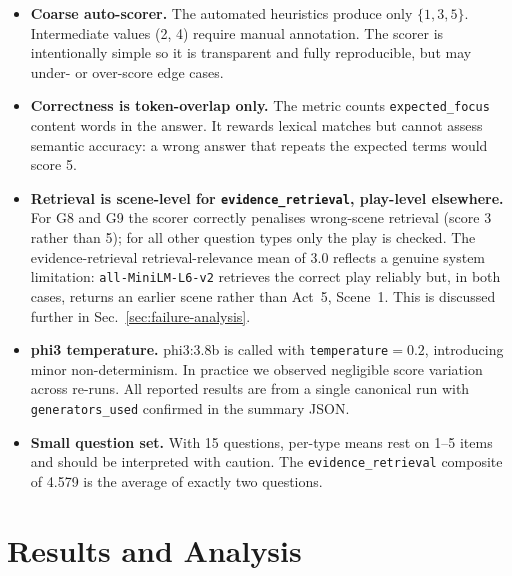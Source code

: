 \documentclass[10pt,conference]{IEEEtran}
\begin{document}
\begin{itemize}
    \item \textbf{Coarse auto-scorer.} The automated heuristics
        produce only $\{1, 3, 5\}$. Intermediate values (2, 4) require
        manual annotation. The scorer is intentionally simple so it is
        transparent and fully reproducible, but may under- or
        over-score edge cases.

    \item \textbf{Correctness is token-overlap only.} The metric
        counts \texttt{expected\_focus} content words in the answer.
        It rewards lexical matches but cannot assess semantic
        accuracy: a wrong answer that repeats the expected terms would
        score 5.

    \item \textbf{Retrieval is scene-level for
        \texttt{evidence\_retrieval}, play-level elsewhere.}
        For G8 and G9 the scorer correctly penalises wrong-scene
        retrieval (score 3 rather than 5); for all other question
        types only the play is checked. The evidence-retrieval
        retrieval-relevance mean of 3.0 reflects a genuine system
        limitation: \texttt{all-MiniLM-L6-v2} retrieves the correct
        play reliably but, in both cases, returns an earlier scene
        rather than Act~5, Scene~1. This is discussed further in
        Sec.~\ref{sec:failure-analysis}.

    \item \textbf{phi3 temperature.} phi3:3.8b is called with
        \texttt{temperature}$=0.2$, introducing minor
        non-determinism. In practice we observed negligible score
        variation across re-runs. All reported results are from a
        single canonical run with \texttt{generators\_used}
        confirmed in the summary JSON.

    \item \textbf{Small question set.} With 15 questions, per-type
        means rest on 1--5 items and should be interpreted with
        caution. The \texttt{evidence\_retrieval} composite of 4.579
        is the average of exactly two questions.
\end{itemize}

\section{Results and Analysis}
\label{sec:results}
\end{document}
